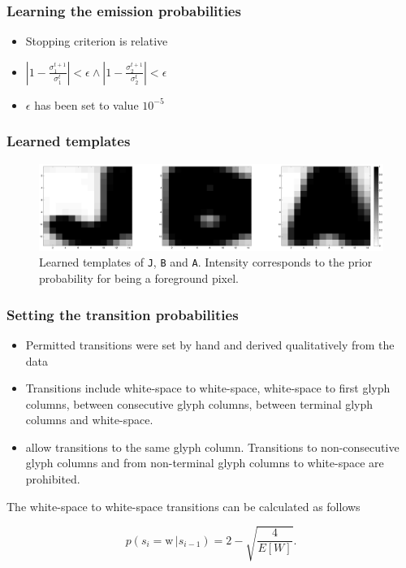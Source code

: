\documentclass{beamer}
\begin{document}
\begin{frame}
  \frametitle{Learning the emission probabilities}
\begin{itemize}
\item Stopping criterion is relative
\item  $|1-\frac{\sigma_1^{t+1}}{\sigma_1^{t}}| < \epsilon \wedge |1-\frac{\sigma_2^{t+1}}{\sigma_2^{t}}| < \epsilon$
\item$\epsilon$ has been set to value $10^{-5}$
\end{itemize}  
\end{frame}

\begin{frame}
  \frametitle{Learned templates}
\begin{figure}[htp]
\centering
\includegraphics[width=\linewidth]{pics/jba.png}
\caption{Learned templates of \texttt{J}, \texttt{B} and
  \texttt{A}. Intensity corresponds to the prior probability for being
  a foreground pixel.}
\label{fig:templates}
\end{figure}
\end{frame}

\begin{frame}
  \frametitle{Setting the transition probabilities}
\begin{itemize}
\item Permitted transitions were set by hand and derived qualitatively
  from the data
\item Transitions include white-space to white-space, white-space to
  first glyph columns, between consecutive glyph columns, between
  terminal glyph columns and white-space.
\item allow transitions to the same glyph column. Transitions to
  non-consecutive glyph columns and from non-terminal glyph columns to
  white-space are prohibited.
\end{itemize}

The white-space to white-space transitions can be calculated as follows

\[ 
 p(s_i=\text{w} \,|s_{i-1}) = 2-\sqrt{\frac{4}{E[W]}}.
\]
\end{frame}
\end{document}
